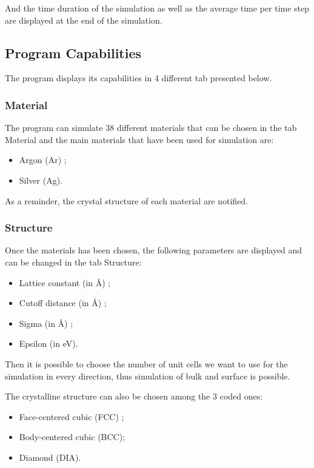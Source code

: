And the time duration of the simulation as well as the average time per time step are displayed at the end of the simulation.

\subsection{Program Capabilities}

The program displays its capabilities in 4 different tab presented below.

\subsubsection{Material}

The program can simulate 38 different materials that can be chosen in the tab Material and the main materials that have been used for simulation are:

\begin{itemize}
\item Argon (Ar) ; 
\item Silver (Ag).
\end{itemize}

As a reminder, the crystal structure of each material are notified.

\subsubsection{Structure}

Once the materials has been chosen, the following parameters are displayed and can be changed in the tab Structure:

\begin{itemize}
\item Lattice constant (in \AA) ; 
\item Cutoff distance (in \AA) ;
\item Sigma (in \AA) ; 
\item Epsilon (in eV).
\end{itemize}

Then it is possible to choose the number of unit cells we want to use for the simulation in every direction, thus simulation of bulk and surface is possible.

The crystalline structure can also be chosen among the 3 coded ones:

\begin{itemize}
\item Face-centered cubic (FCC) ; 
\item Body-centered cubic (BCC);
\item Diamond (DIA).
\end{itemize}

